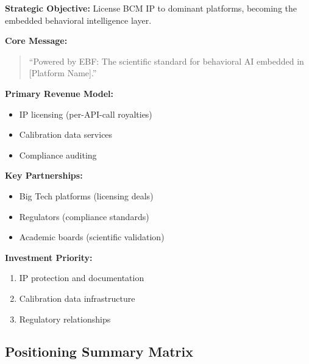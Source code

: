 \begin{tcolorbox}[colback=blue!5!white, colframe=blue!75!black,
    title=Strategic Position D: Intel Inside]

\textbf{Strategic Objective:}
License BCM IP to dominant platforms, becoming the embedded behavioral intelligence layer.

\textbf{Core Message:}
\begin{quote}
``Powered by EBF: The scientific standard for behavioral AI embedded in [Platform Name].''
\end{quote}

\textbf{Primary Revenue Model:}
\begin{itemize}[nosep]
\item IP licensing (per-API-call royalties)
\item Calibration data services
\item Compliance auditing
\end{itemize}

\textbf{Key Partnerships:}
\begin{itemize}[nosep]
\item Big Tech platforms (licensing deals)
\item Regulators (compliance standards)
\item Academic boards (scientific validation)
\end{itemize}

\textbf{Investment Priority:}
\begin{enumerate}[nosep]
\item IP protection and documentation
\item Calibration data infrastructure
\item Regulatory relationships
\end{enumerate}

\end{tcolorbox}


\subsection{Positioning Summary Matrix}

